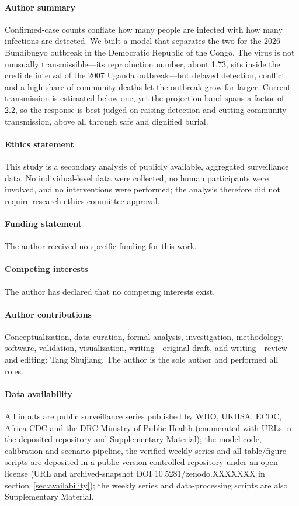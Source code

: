 \documentclass[10pt]{plos}
\newcommand{\zenododoi}{10.5281/zenodo.XXXXXXX}
\begin{document}

\paragraph*{Author summary}
Confirmed-case counts conflate how many people are infected with how
many infections are detected. We built a model that separates the two
for the 2026 Bundibugyo outbreak in the Democratic Republic of the
Congo. The virus is not unusually transmissible---its reproduction
number, about 1.73, sits inside the credible interval of the 2007
Uganda outbreak---but delayed detection, conflict and a high share of
community deaths let the outbreak grow far larger. Current transmission
is estimated below one, yet the projection band spans a factor of 2.2,
so the response is best judged on raising detection and cutting
community transmission, above all through safe and dignified burial.
\paragraph*{Ethics statement}
This study is a secondary analysis of publicly available, aggregated
surveillance data. No individual-level data were collected, no human
participants were involved, and no interventions were performed; the
analysis therefore did not require research ethics committee approval.

\paragraph*{Funding statement}
The author received no specific funding for this work.

\paragraph*{Competing interests}
The author has declared that no competing interests exist.

\paragraph*{Author contributions}
Conceptualization, data curation, formal analysis, investigation,
methodology, software, validation, visualization, writing---original
draft, and writing---review and editing: Tang Shujiang. The author is the
sole author and performed all roles.

\paragraph*{Data availability}
All inputs are public surveillance series published by WHO, UKHSA, ECDC, Africa CDC and the DRC Ministry of Public Health (enumerated with URLs in the deposited repository and Supplementary Material);
the model code, calibration and scenario pipeline, the verified weekly
series and all table/figure scripts are deposited in a public
version-controlled repository under an open license (URL and
archived-snapshot DOI \zenododoi{} in section~\ref{sec:availability}); the weekly
series and data-processing scripts are also Supplementary Material.
\end{document}
